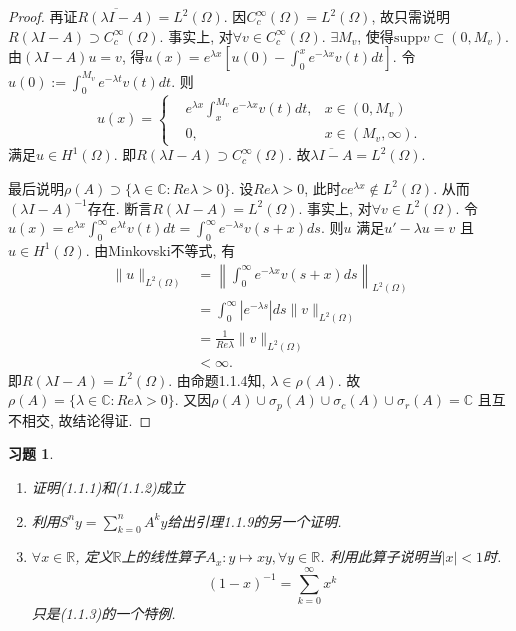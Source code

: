 \documentclass[UTF8,twoside]{ctexbook}
\newtheorem{exercise}{习题}[section]
\newcommand{\kx}{\mathbb}
\numberwithin{equation}{section}
\begin{document}
\begin{proof}
		再证$\overline{R(\lambda I-A)}=L^2(\Omega)$. 因$C_c^\infty(\Omega)=L^2(\Omega)$, 故只需说明$R(\lambda I-A)\supset C_c^\infty(\Omega)$. 事实上, 对$\forall v\in C_c^\infty(\Omega)$. $\exists M_v$, 使得$\text{supp}v\subset(0,M_v)$. 由$(\lambda I-A)u=v$, 得$u(x)=e^{\lambda x}[u(0)-\int_0^x e^{-\lambda x}v(t)dt]$. 令
		$u(0):=\int_0^{M_v}e^{-\lambda t}v(t)dt$. 则
		\[
		u(x)=\left\{
		\begin{aligned}
		&e^{\lambda x}\int_x^{M_v}e^{-\lambda x}v(t)dt,&x\in(0,M_v)\\
		&0,&x\in(M_v,\infty).
		\end{aligned}
		\right.
		\]
		满足$u\in H^1(\Omega)$. 即$R(\lambda I-A)\supset C_c^\infty(\Omega)$. 故$\overline{\lambda I-A}=L^2(\Omega)$.

		最后说明$\rho(A)\supset\{\lambda\in\kx C: Re\lambda>0\}$. 设$Re\lambda>0$, 此时$ce^{\lambda x}\notin L^2(\Omega)$. 从而$(\lambda I-A)^{-1}$存在. 断言$R(\lambda I-A)=L^2(\Omega)$. 事实上, 对$\forall v\in L^2(\Omega)$. 令$u(x)=e^{\lambda x}\int_0^\infty e^{\lambda t}v(t)dt=\int_0^\infty e^{-\lambda s}v(s+x)ds$. 则$u$ 满足$u'-\lambda u=v$ 且$u\in H^1(\Omega)$. 由Minkovski不等式, 有
		\[
		\begin{aligned}
		\|u\|_{L^2(\Omega)}&=\left\|\int_0^\infty e^{-\lambda x}v(s+x)ds\right\|_{L^2(\Omega)}\\
		&=\int_0^\infty|e^{-\lambda s}|ds\|v\|_{L^2(\Omega)}\\
		&=\frac{1}{Re\lambda}\|v\|_{L^2(\Omega)}\\
		&<\infty.
		\end{aligned}
		\]
		即$R(\lambda I-A)=L^2(\Omega)$. 由命题1.1.4知, $\lambda\in\rho(A)$. 故$\rho(A)=\{\lambda\in\kx C:Re\lambda>0\}$. 又因$\rho(A)\cup\sigma_p(A)\cup\sigma_c(A)\cup\sigma_r(A)=\kx C$ 且互不相交, 故结论得证.
	\end{proof}
	\begin{exercise}
		\begin{enumerate}[(1)]
			\item 证明(1.1.1)和(1.1.2)成立
			\item 利用$S^ny=\sum_{k=0}^{n}A^ky$给出引理1.1.9的另一个证明.
			\item $\forall x\in \kx R$, 定义$\kx R$上的线性算子$A_x:y\mapsto xy,\forall y\in\kx R$. 利用此算子说明当$|x|<1$时.
			\[
			(1-x)^{-1}=\sum_{k=0}^{\infty}x^k
			\]
			只是(1.1.3)的一个特例.
		\end{enumerate}
	\end{exercise}
\end{document}

